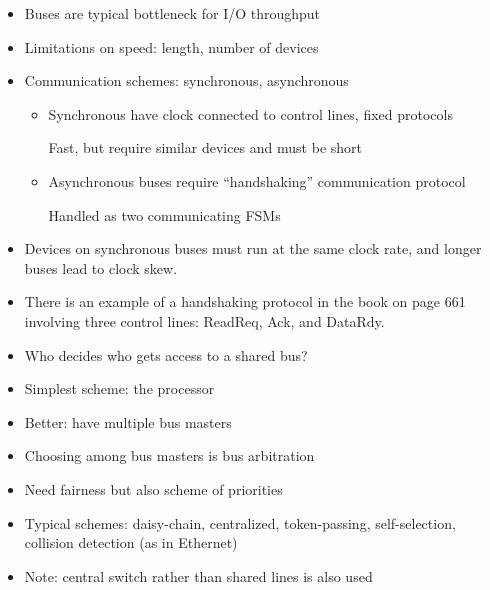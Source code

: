 \begin{frame}[fragile]
\begin{itemize}
\item Buses are typical bottleneck for I/O throughput
\item Limitations on speed: length, number of devices
\item Communication schemes: synchronous, asynchronous
\begin{itemize}
\item Synchronous have clock connected to control lines, fixed
protocols

	 Fast, but require similar devices and must be short
\item Asynchronous buses require 
``handshaking'' communication protocol

Handled as two communicating FSMs
\end{itemize}
\end{itemize}
\BNotes\ifnum{}
\begin{itemize}
\item Devices on synchronous buses must run at the same clock rate,
and longer buses lead to clock skew.
\item There is an example of a handshaking protocol in the book on
page 661 involving three control lines: ReadReq, Ack, and DataRdy.
\end{itemize}
\fi\ENotes
\end{frame}

\begin{frame}[fragile]
\begin{itemize}
\item Who decides who gets access to a shared bus?
\item Simplest scheme: the processor
\item Better: have multiple bus masters
\item Choosing among bus masters is bus arbitration
\item Need fairness but also scheme of priorities
\item Typical schemes: daisy-chain, centralized, token-passing,
  self-selection, collision detection (as in Ethernet)
  \medskip
\item Note: central switch rather than shared lines is also used
\end{itemize}
\BNotes\ifnum{}
~%
\fi\ENotes
\end{frame}

